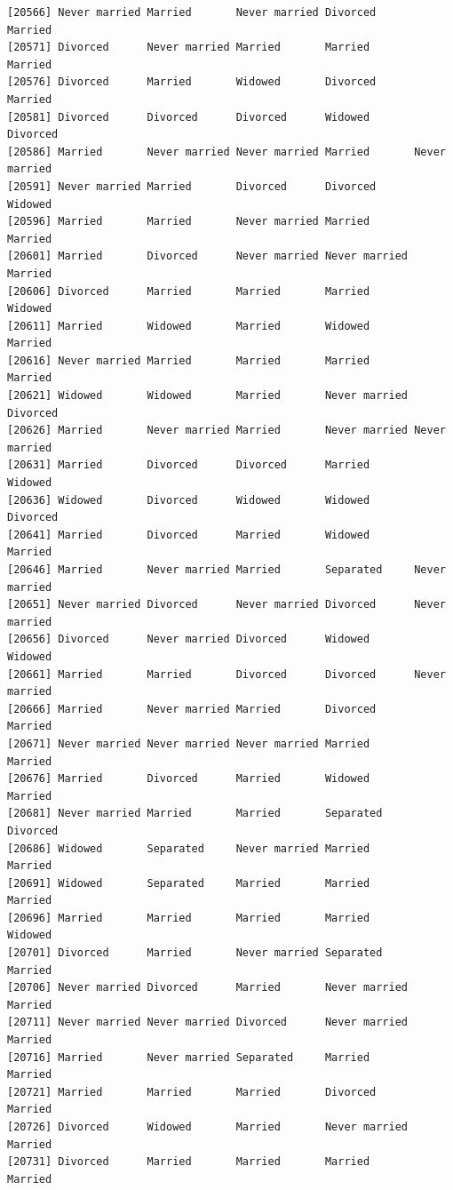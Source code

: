 \documentclass[
  letterpaper,
  DIV=11,
  numbers=noendperiod,
  oneside]{scrartcl}
\begin{document}
\begin{verbatim}
[20566] Never married Married       Never married Divorced      Married      
[20571] Divorced      Never married Married       Married       Married      
[20576] Divorced      Married       Widowed       Divorced      Married      
[20581] Divorced      Divorced      Divorced      Widowed       Divorced     
[20586] Married       Never married Never married Married       Never married
[20591] Never married Married       Divorced      Divorced      Widowed      
[20596] Married       Married       Never married Married       Married      
[20601] Married       Divorced      Never married Never married Married      
[20606] Divorced      Married       Married       Married       Widowed      
[20611] Married       Widowed       Married       Widowed       Married      
[20616] Never married Married       Married       Married       Married      
[20621] Widowed       Widowed       Married       Never married Divorced     
[20626] Married       Never married Married       Never married Never married
[20631] Married       Divorced      Divorced      Married       Widowed      
[20636] Widowed       Divorced      Widowed       Widowed       Divorced     
[20641] Married       Divorced      Married       Widowed       Married      
[20646] Married       Never married Married       Separated     Never married
[20651] Never married Divorced      Never married Divorced      Never married
[20656] Divorced      Never married Divorced      Widowed       Widowed      
[20661] Married       Married       Divorced      Divorced      Never married
[20666] Married       Never married Married       Divorced      Married      
[20671] Never married Never married Never married Married       Married      
[20676] Married       Divorced      Married       Widowed       Married      
[20681] Never married Married       Married       Separated     Divorced     
[20686] Widowed       Separated     Never married Married       Married      
[20691] Widowed       Separated     Married       Married       Married      
[20696] Married       Married       Married       Married       Widowed      
[20701] Divorced      Married       Never married Separated     Married      
[20706] Never married Divorced      Married       Never married Married      
[20711] Never married Never married Divorced      Never married Married      
[20716] Married       Never married Separated     Married       Married      
[20721] Married       Married       Married       Divorced      Married      
[20726] Divorced      Widowed       Married       Never married Married      
[20731] Divorced      Married       Married       Married       Married      

\end{verbatim}
\end{document}
